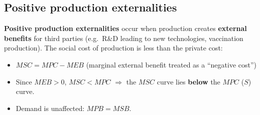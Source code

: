 \subsection{Positive production externalities}
\textbf{Positive production externalities} occur when production creates \textbf{external benefits} for third parties (e.g.\ R\&D leading to new technologies, vaccination production). The social cost of production is less than the private cost:
\begin{itemize}
  \item $MSC = MPC - MEB$ (marginal external benefit treated as a ``negative cost'')
  \item Since $MEB > 0$, $MSC < MPC$ $\Rightarrow$ the $MSC$ curve lies \textbf{below} the $MPC$ ($S$) curve.
  \item Demand is unaffected: $MPB = MSB$.
\end{itemize}

